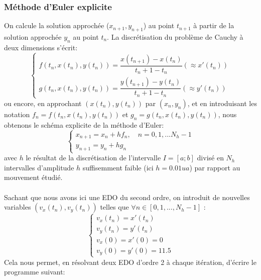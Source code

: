 \documentclass[11pt]{article} %
\begin{document}
\subsubsection{Méthode d'Euler explicite}
On calcule la solution approchée ($x_{n+1},y_{n+1}$) au point $t_{n+1}$ à partir de la solution approchée $y_n$ au point $t_n$.
La discrétisation du problème de Cauchy à deux dimensions s’écrit:
\begin{equation}
\begin{cases} f(t_n,x(t_n),y(t_n)) = \dfrac{x(t_{n+1})-x(t_n)}{t_n+1-t_n} (\approx x'(t_n)) \\ g(t_n,x(t_n),y(t_n)) = \dfrac{y(t_{n+1})-y(t_n)}{t_n+1-t_n} (\approx y'(t_n)) \end{cases}
\end{equation}
ou encore, en approchant $(x(t_n),y(t_n))$ par $(x_n,y_n)$, et en introduisant les notation $f_n = f(t_n,x(t_n),y(t_n))$ et  $g_n = g(t_n,x(t_n),y(t_n))$, nous obtenons le schéma explicite de la méthode d'Euler:
\begin{equation}
\begin{cases} x_{n+1} = x_n + hf_n, \quad n=0,1,... N_h-1 \\y_{n+1} = y_n + hg_n \end{cases}
\end{equation}
avec $h$ le résultat de la discrétisation de l’intervalle $I=[a;b]$ divisé en $N_h$ intervalles d’amplitude $h$ suffisemment faible (ici $h=0.01 ua$) par rapport au mouvement étudié.\\\\
Sachant que nous avons ici une EDO du second ordre, on introduit de nouvelles variables $(v_x(t_n),v_y(t_n))$ telles que $\forall n \in [0,1,...,N_h-1] $ :
\begin{equation}
\begin{cases}v_x(t_n)=x'(t_n) \\v_y(t_n)=y'(t_n) \\ v_x(0) = x'(0) = 0 \\ v_y(0) = y'(0) = 11.5 \end{cases}
\end{equation}
Cela nous permet, en résolvant deux EDO d'ordre 2 à chaque itération, d'écrire le programme suivant:

\end{document}
